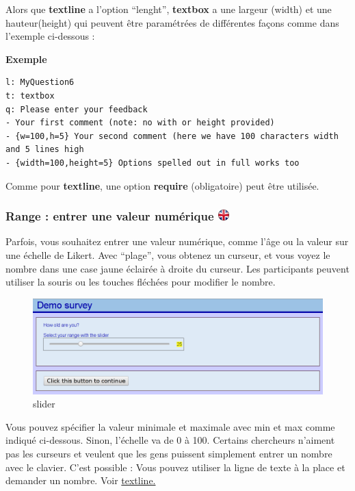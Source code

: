 \documentclass[
]{book}
\begin{document}
Alors que \textbf{textline} a l'option ``lenght'', \textbf{textbox} a une largeur (width) et une hauteur(height) qui peuvent être paramétrées de différentes façons comme dans l'exemple ci-dessous :

\textbf{Exemple}

\begin{verbatim}
l: MyQuestion6
t: textbox
q: Please enter your feedback
- Your first comment (note: no with or height provided)
- {w=100,h=5} Your second comment (here we have 100 characters width and 5 lines high
- {width=100,height=5} Options spelled out in full works too
\end{verbatim}

Comme pour \textbf{textline}, une option \textbf{require} (obligatoire) peut être utilisée.

\hypertarget{range-entrer-une-valeur-numuxe9rique}{%
\subsubsection[Range : entrer une valeur numérique ]{\texorpdfstring{Range : entrer une valeur numérique \href{https://www.psytoolkit.org/doc3.2.0/online-survey-syntax.html\#range}{\protect\includegraphics{img/ukflag.png}}}{Range : entrer une valeur numérique }}\label{range-entrer-une-valeur-numuxe9rique}}

Parfois, vous souhaitez entrer une valeur numérique, comme l'âge ou la valeur sur une échelle de Likert. Avec ``plage'', vous obtenez un curseur, et vous voyez le nombre dans une case jaune éclairée à droite du curseur. Les participants peuvent utiliser la souris ou les touches fléchées pour modifier le nombre.

\begin{figure}
\centering
\includegraphics{img/slider.png}
\caption{slider}
\end{figure}

Vous pouvez spécifier la valeur minimale et maximale avec min et max comme indiqué ci-dessous. Sinon, l'échelle va de 0 à 100.
Certains chercheurs n'aiment pas les curseurs et veulent que les gens puissent simplement entrer un nombre avec le clavier. C'est possible : Vous pouvez utiliser la ligne de texte à la place et demander un nombre. Voir \protect\hyperlink{textline}{textline.}
\end{document}
